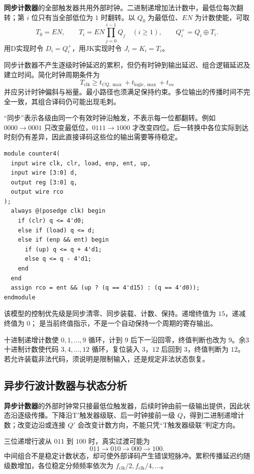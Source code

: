 \documentclass[UTF8,fontset=none,zihao=-4,a4paper]{ctexart}
\newcommand{\term}[1]{\textbf{#1}}
\newcommand{\code}[1]{\allowbreak{\small\texttt{\detokenize{#1}}}\allowbreak}
\begin{document}
\term{同步计数器}的全部触发器共用外部时钟。二进制递增加法计数中，最低位每次翻转；第 $i$ 位只有当全部低位为 $1$ 时翻转。以 $Q_0$ 为最低位、$EN$ 为计数使能，可取
\[
T_0=EN,\qquad T_i=EN\prod_{j=0}^{i-1}Q_j\quad(i\ge1),\qquad Q_i^+=Q_i\oplus T_i.
\]
用D实现时令 $D_i=Q_i^+$，用JK实现时令 $J_i=K_i=T_i$。

同步计数器不产生逐级时钟延迟的累积，但仍有时钟到输出延迟、组合逻辑延迟及建立时间。简化时钟周期条件为
\[
T_{\mathrm{clk}}\ge t_{CQ,\max}+t_{\mathrm{logic},\max}+t_{su}
\]
并应另计时钟偏斜与裕量。最小路径也须满足保持约束。多位输出的传播时间不完全一致，其组合译码仍可能出现毛刺。

“同步”表示各级由同一个有效时钟沿触发，不表示每一位都翻转。例如 $0000\to0001$ 只改变最低位，$0111\to1000$ 才改变四位。后一转换中各位实际到达时刻仍有差异，因此直接译码这些位的输出需要等待稳定。

\par\noindent\begin{minipage}{\linewidth}
\begin{lstlisting}
module counter4(
  input wire clk, clr, load, enp, ent, up,
  input wire [3:0] d,
  output reg [3:0] q,
  output wire rco
);
  always @(posedge clk) begin
    if (clr) q <= 4'd0;
    else if (load) q <= d;
    else if (enp && ent) begin
      if (up) q <= q + 4'd1;
      else q <= q - 4'd1;
    end
  end
  assign rco = ent && (up ? (q == 4'd15) : (q == 4'd0));
endmodule
\end{lstlisting}
\end{minipage}\par
该模型的控制优先级是同步清零、同步装载、计数、保持。递增终值为 $15$，递减终值为 $0$；\code{rco} 是当前终值指示，不是一个自动保持一个周期的寄存输出。

十进制递增计数使 $0,1,\ldots,9$ 循环，计到 $9$ 后下一沿回零，终值判断也改为 $9$。余3十进制计数使代码 $3,4,\ldots,12$ 循环，复位装入 $3$，$12$ 后回到 $3$，终值判断为 $12$。若允许装载非法代码，须说明是限制输入，还是规定非法状态恢复。

\subsection{异步行波计数器与状态分析}
\term{异步计数器}的外部时钟常只接最低位触发器，后续时钟由前一级输出提供，因此状态沿逐级传播。下降沿T$'$触发器级联、后一时钟接前一级 $Q$，得到二进制递增计数；改变边沿或连接 $Q'$ 会改变计数方向，不能只凭“T触发器级联”判定方向。

三位递增行波从 $011$ 到 $100$ 时，真实过渡可能为
\[
011\to010\to000\to100.
\]
中间组合不是稳定计数状态，却可使外部译码产生错误短脉冲。累积传播延迟约随级数增加，各位稳定分频频率依次为 $f_{\mathrm{clk}}/2,f_{\mathrm{clk}}/4,\ldots$。
\end{document}
